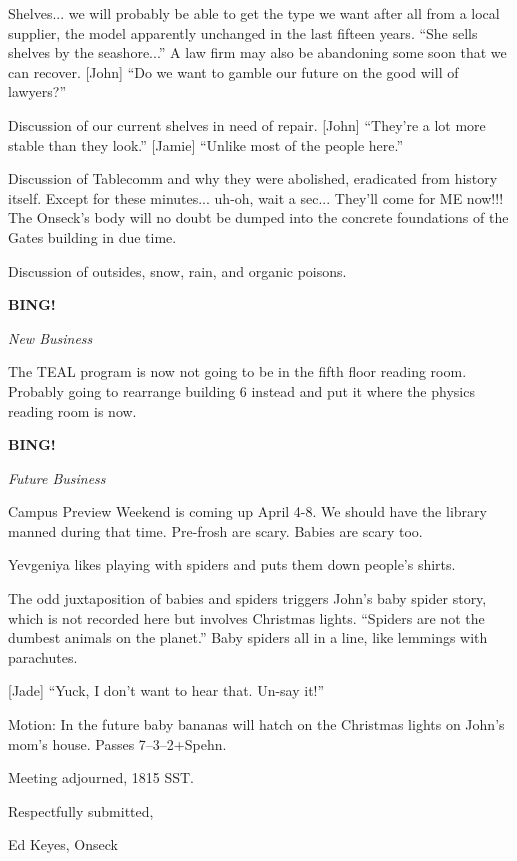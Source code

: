 \documentclass[12pt]{article}
\newcommand{\bing}{{\bf BING!} }
\newcommand{\goto}[1]{\bing \vskip 12pt \centerline{{\em{#1}}}}
\begin{document}
Shelves... we will probably be able to get the type we want after all
from a local supplier, the model apparently unchanged in the last
fifteen years.  ``She sells shelves by the seashore...''  A law firm
may also be abandoning some soon that we can recover.  [John] ``Do we
want to gamble our future on the good will of lawyers?''

Discussion of our current shelves in need of repair.  [John] ``They're
a lot more stable than they look.''  [Jamie] ``Unlike most of the
people here.''

Discussion of Tablecomm and why they were abolished, eradicated from
history itself.  Except for these minutes... uh-oh, wait a sec...
They'll come for ME now!!!  The Onseck's body will no doubt be dumped
into the concrete foundations of the Gates building in due time.

Discussion of outsides, snow, rain, and organic poisons.

\goto{New Business}

The TEAL program is now not going to be in the fifth floor reading
room.  Probably going to rearrange building 6 instead and put it
where the physics reading room is now.

\goto{Future Business}

Campus Preview Weekend is coming up April 4-8.  We should have the
library manned during that time.  Pre-frosh are scary.  Babies are
scary too.

Yevgeniya likes playing with spiders and puts them down people's
shirts.

The odd juxtaposition of babies and spiders triggers John's baby
spider story, which is not recorded here but involves Christmas
lights.  ``Spiders are not the dumbest animals on the planet.''
Baby spiders all in a line, like lemmings with parachutes.

[Jade] ``Yuck, I don't want to hear that.  Un-say it!''

Motion: In the future baby bananas will hatch on the Christmas
lights on John's mom's house.  Passes 7--3--2+Spehn.

\vspace{12pt}

\noindent
Meeting adjourned, 1815 SST.

\vspace{18pt}

\centerline{Respectfully submitted,}
\centerline{Ed Keyes, Onseck}
\end{document}
